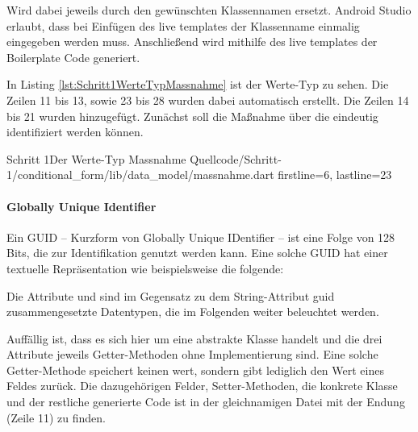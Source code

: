  Wird dabei jeweils durch den gewünschten Klassennamen ersetzt. Android Studio erlaubt, dass bei Einfügen des live templates der Klassenname einmalig eingegeben werden muss.  Anschließend wird mithilfe des live templates der Boilerplate Code generiert.

In Listing \ref{lst:Schritt1WerteTypMassnahme} ist der Werte-Typ  zu sehen. Die Zeilen 11 bis 13, sowie 23 bis 28 wurden dabei automatisch erstellt. Die Zeilen 14 bis 21 wurden hinzugefügt. Zunächst soll die Maßnahme über die  eindeutig identifiziert werden können.

\begin{alexlisting}{Schritt 1}{Der Werte-Typ Massnahme}
  {Quellcode/Schritt-1/conditional_form/lib/data_model/massnahme.dart}
  {firstline=6, lastline=23}
  \label{lst:Schritt1WerteTypMassnahme}
\end{alexlisting}

\paragraph{Globally Unique Identifier}
Ein GUID – Kurzform von Globally Unique IDentifier – ist  eine Folge von 128 Bits, die zur Identifikation genutzt werden kann. Eine solche GUID hat einer textuelle Repräsentation wie beispielsweise die folgende: 


Die Attribute  und  sind im Gegensatz zu dem String-Attribut guid zusammengesetzte Datentypen, die im Folgenden weiter beleuchtet werden.

Auffällig ist, dass es sich hier um eine abstrakte Klasse handelt und die drei Attribute jeweils Getter-Methoden ohne Implementierung sind. Eine solche Getter-Methode speichert keinen wert, sondern gibt lediglich den Wert eines Feldes zurück. Die dazugehörigen Felder,  Setter-Methoden, die konkrete Klasse und der restliche generierte Code ist in der gleichnamigen Datei mit der Endung  (Zeile 11) zu finden.

